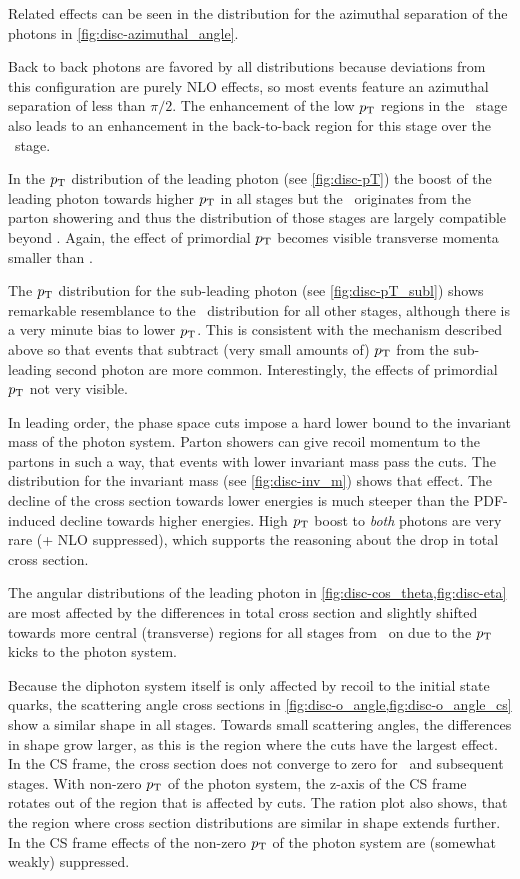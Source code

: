 Related effects can be seen in the distribution for the azimuthal
separation of the photons in \cref{fig:disc-azimuthal_angle}.

Back to back photons are favored by all distributions because
deviations from this configuration are purely NLO effects, so most
events feature an azimuthal separation of less than \(\pi/2\).  The
enhancement of the low \(p_\mathrm{T}\) regions in the \stthree\ stage also
leads to an enhancement in the back-to-back region for this stage over
the \sttwo\ stage.

In the \(p_\mathrm{T}\) distribution of the leading photon (see
\cref{fig:disc-pT}) the boost of the leading photon towards higher
\(p_\mathrm{T}\) in all stages but the \stone\ originates from the parton
showering and thus the distribution of those stages are largely
compatible beyond . Again, the effect of primordial \(p_\mathrm{T}\)
becomes visible transverse momenta smaller than .


The \(p_\mathrm{T}\) distribution for the sub-leading photon (see
\cref{fig:disc-pT_subl}) shows remarkable resemblance to the \stone\
distribution for all other stages, although there is a very minute
bias to lower \(p_\mathrm{T}\). This is consistent with the mechanism described
above so that events that subtract (very small amounts of) \(p_\mathrm{T}\)
from the sub-leading second photon are more common. Interestingly, the
effects of primordial \(p_\mathrm{T}\) not very visible.

In leading order, the phase space cuts impose a hard lower bound to
the invariant mass of the photon system. Parton showers can give
recoil momentum to the partons in such a way, that events with lower
invariant mass pass the cuts. The distribution for the invariant mass
(see \cref{fig:disc-inv_m}) shows that effect. The decline of the
cross section towards lower energies is much steeper than the
PDF-induced decline towards higher energies. High \(p_\mathrm{T}\) boost to
\emph{both} photons are very rare (+ NLO suppressed), which supports
the reasoning about the drop in total cross section.

The angular distributions of the leading photon in
\cref{fig:disc-cos_theta,fig:disc-eta} are most affected by the
differences in total cross section and slightly shifted towards more
central (transverse) regions for all stages from \sttwo\ on due to the
\(p_\mathrm{T}\) kicks to the photon system.

Because the diphoton system itself is only affected by recoil to the
initial state quarks, the scattering angle cross sections in
\cref{fig:disc-o_angle,fig:disc-o_angle_cs} show a similar shape in
all stages. Towards small scattering angles, the differences in shape
grow larger, as this is the region where the cuts have the largest
effect. In the CS frame, the cross section does not converge to zero
for \sttwo\ and subsequent stages. With non-zero \(p_\mathrm{T}\) of the photon
system, the z-axis of the CS frame rotates out of the region that is
affected by cuts. The ration plot also shows, that the region where
cross section distributions are similar in shape extends further. In
the CS frame effects of the non-zero \(p_\mathrm{T}\) of the photon system are
(somewhat weakly) suppressed.

